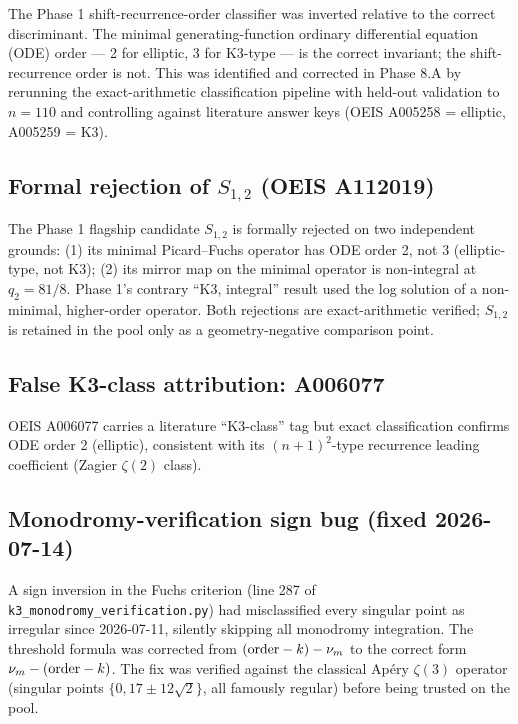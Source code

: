 \documentclass[aps,prd,twocolumn,nofootinbib,superscriptaddress,10pt]{revtex4-2}
\begin{document}
The Phase 1 shift-recurrence-order classifier was inverted relative to the correct discriminant. The minimal generating-function ordinary differential equation (ODE) order --- 2 for elliptic, 3 for K3-type --- is the correct invariant; the shift-recurrence order is not. This was identified and corrected in Phase 8.A by rerunning the exact-arithmetic classification pipeline with held-out validation to $n=110$ and controlling against literature answer keys (OEIS A005258 = elliptic, A005259 = K3).

\subsection{Formal rejection of $S_{1,2}$ (OEIS A112019)}

The Phase 1 flagship candidate $S_{1,2}$ is formally rejected on two independent grounds: (1) its minimal Picard--Fuchs operator has ODE order 2, not 3 (elliptic-type, not K3); (2) its mirror map on the minimal operator is non-integral at $q_2 = 81/8$. Phase 1's contrary ``K3, integral'' result used the log solution of a non-minimal, higher-order operator. Both rejections are exact-arithmetic verified; $S_{1,2}$ is retained in the pool only as a geometry-negative comparison point.

\subsection{False K3-class attribution: A006077}

OEIS A006077 carries a literature ``K3-class'' tag but exact classification confirms ODE order 2 (elliptic), consistent with its $(n+1)^2$-type recurrence leading coefficient (Zagier $\zeta(2)$ class).

\subsection{Monodromy-verification sign bug (fixed 2026-07-14)}

A sign inversion in the Fuchs criterion (line 287 of \texttt{k3\_monodromy\_verification.py}) had misclassified every singular point as irregular since 2026-07-11, silently skipping all monodromy integration. The threshold formula was corrected from $({\rm order} - k) - \nu_m$ to the correct form $\nu_m - ({\rm order} - k)$. The fix was verified against the classical Ap\'ery $\zeta(3)$ operator (singular points $\{0, 17 \pm 12\sqrt{2}\}$, all famously regular) before being trusted on the pool.
\end{document}

